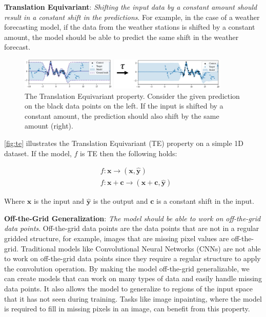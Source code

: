 \documentclass[../../main.tex]{subfiles}
\begin{document}
\textbf{Translation Equivariant}: \emph{Shifting the input data by a constant amount should result in a constant shift in the predictions}. For example, in the case of a weather forecasting model, if the data from the weather stations is shifted by a constant amount, the model should be able to predict the same shift in the weather forecast.

\begin{figure}[H]
	\centering
	\includegraphics[width=0.9\textwidth]{./te.PNG}
	\caption{The Translation Equivariant property. Consider the given prediction on the black data points on the left. If the input is shifted by a constant amount, the prediction should also shift by the same amount (right).}
	\label{fig:te}
\end{figure}



\autoref{fig:te} illustrates the Translation Equivariant (TE) property on a simple 1D dataset. If the model, $f$ is TE then the following holds:

\begin{align}
	&f: \bm{x} \rightarrow (\bm{x}, \bm{\hat{y}}) \\
	&f: \bm{x} + \bm{c} \rightarrow (\bm{x} + \bm{c}, \bm{\hat{y}})
\end{align}

Where $\bm{x}$ is the input and $\bm{\hat{y}}$ is the output and $\bm{c}$ is a constant shift in the input.


\textbf{Off-the-Grid Generalization}: \emph{The model should be able to work on off-the-grid data points}. Off-the-grid data points are the data points that are not in a regular gridded structure, for example, images that are missing pixel values are off-the-grid. Traditional models like Convolutional Neural Networks (CNNs) are not able to work on off-the-grid data points since they require a regular structure to apply the convolution operation. By making the model off-the-grid generalizable, we can create models that can work on many types of data and easily handle missing data points. It also allows the model to generalize to regions of the input space that it has not seen during training. Tasks like image inpainting, where the model is required to fill in missing pixels in an image, can benefit from this property.
\end{document}
